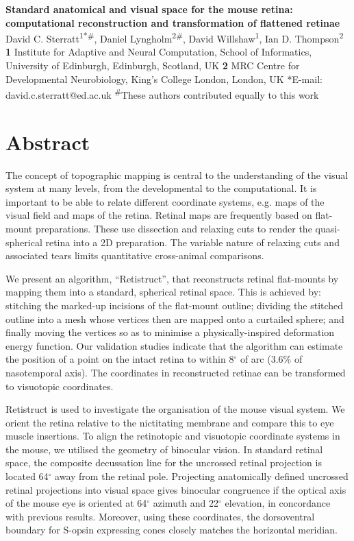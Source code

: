 \documentclass[10pt]{article}
\date{}
\begin{document}
\begin{flushleft}
\textbf{Standard anatomical and visual space for the mouse retina:
computational reconstruction and transformation of flattened
retinae\newline
}David C. Sterratt\textsuperscript{1*\#}, Daniel
Lyngholm\textsuperscript{2\#}, David Willshaw\textsuperscript{1}, Ian
D. Thompson\textsuperscript{2} \newline
\textbf{1} Institute for Adaptive and Neural Computation, School of
Informatics, University of Edinburgh, Edinburgh, Scotland, UK\newline
\textbf{2} MRC Centre for Developmental Neurobiology, King's College
London, London, UK\newline
*E-mail: david.c.sterratt@ed.ac.uk \newline
\textsuperscript{\#}These authors contributed equally to this work
\end{flushleft}

\section*{Abstract}
The concept of topographic mapping is central to the understanding of
the visual system at many levels, from the developmental to the
computational. It is important to be able to relate different 
coordinate systems, e.g. maps of the visual field and maps of the
retina. Retinal maps are frequently based on flat-mount preparations.
These use dissection and relaxing cuts to render the quasi-spherical
retina into a 2D preparation. The variable nature of relaxing cuts
and associated tears limits quantitative cross-animal comparisons.

We present an algorithm, ``Retistruct'', that reconstructs retinal
flat-mounts by mapping them into a standard, spherical retinal space.
This is achieved by: stitching the marked-up incisions of the
flat-mount outline; dividing the stitched outline into a mesh whose
vertices then are mapped onto a curtailed sphere; and finally moving
the vertices so as to minimise a physically-inspired deformation
energy function. Our validation studies indicate that the algorithm
can estimate the position of a point on the intact retina to within
8$^{\circ}$ of arc (3.6\% of nasotemporal axis).  The coordinates in
reconstructed retinae can be  transformed to visuotopic coordinates.

Retistruct is used to investigate the organisation of the mouse visual
system. We orient the retina relative to the nictitating membrane and
compare this to eye muscle insertions. To align the retinotopic and
visuotopic coordinate systems in the mouse, we utilised the geometry
of binocular vision. In standard retinal space, the composite
decussation line for the uncrossed retinal projection is located
64$^{\circ}$ away from the retinal pole.  Projecting anatomically defined
uncrossed retinal projections into visual space gives binocular
congruence if the optical axis of the mouse eye is oriented at
64$^{\circ}$ azimuth and 22$^{\circ}$ elevation, in concordance with previous
results. Moreover, using these coordinates, the dorsoventral boundary
for S-opsin expressing cones closely matches the horizontal meridian.
\end{document}
